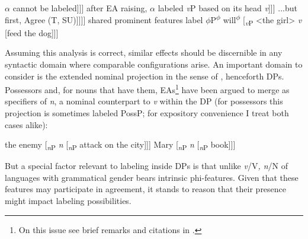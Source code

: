 \documentclass[output=paper
,modfonts
,nonflat]{langsci/langscibook}
\begin{document}
\begin{exe} 
\ex \label{ex-carstens:1} \xlist
	\ex \label{ex-carstens:1a} $\alpha$ cannot be labeled\newline
	[$\alpha$ [\textsubscript{DP} the girl] [\textsubscript{\textit{v}P } \textit{v} [\textsubscript{VP} feed [\textsubscript{DP} the dog]]]] 
	\ex \label{ex-carstens:1b}after EA raising, $\alpha$ labeled \textit{v}P  based on its head \textit{v}\newline
	[\textsubscript{\textit{v}P } {\textless}the girl{\textgreater} [\textsubscript{\textit{v}P } \textit{v} [\textsubscript{VP} feed [\textsubscript{DP} the dog]]]] 
	\ex \label{ex-carstens:1c} ...but first, Agree (T, SU)\newline
	[T\textsubscript{u$\phi$} [\textsubscript{\textit{v}P } [\textsubscript{DP} the girl\textsubscript{$\phi$}] [\textsubscript{\textit{v}P } \textit{v} [\textsubscript{VP} feed [\textsubscript{DP} the dog]]]]] 
	\ex \label{ex-carstens:d}shared prominent features label $\phi$P\newline
	[\textsubscript{$\phi$P} [\textsubscript{DP} the girl]\textsuperscript{$\phi$} will\textsuperscript{$\phi$} [\textsubscript{\textit{v}P } <the girl> \textit{v} [feed the dog]]]  
\endxlist
\end{exe}
Assuming this analysis is correct, similar effects should be discernible in any syntactic domain where comparable configurations arise. An important domain to consider is the extended nominal projection in the sense of \citet{Grimshaw19912005}, henceforth DPs. Possessors and, for nouns that have them, EAs\footnote{On this issue see brief remarks and citations in .} have been argued to merge as specifiers of \textit{n}, a nominal counterpart to \textit{v} within the DP (for possessors this projection is sometimes labeled PossP; for expository convenience I treat both cases alike): 

\begin{exe}
\ex \label{ex-carstens:2}\xlist
	\ex {[\textsubscript{$\alpha$}} the enemy [\textsubscript{\textit{n}P} \textit{n} [\textsubscript{\textit{n}P} attack on the city]]]
	\ex {[\textsubscript{$\alpha$}} Mary [\textsubscript{\textit{n}P} \textit{n} [\textsubscript{\textit{n}P} book]]]
\endxlist
\end{exe}
But a special factor relevant to labeling inside DPs is that unlike \textit{v}/V\textit{, n}/N of languages with grammatical gender bears intrinsic phi-features. Given that these features may participate in agreement, it stands to reason that their presence might impact labeling possibilities.
\end{document}

